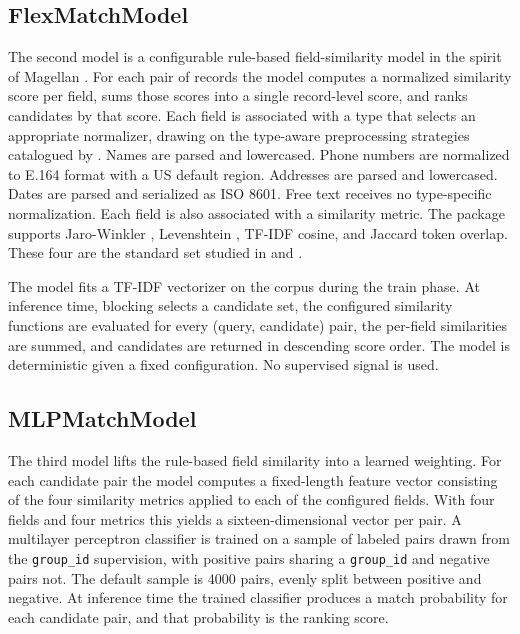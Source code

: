 \documentclass[10pt,letterpaper]{article}
\begin{document}
\subsection{FlexMatchModel}

The second model is a configurable rule-based field-similarity model
in the spirit of Magellan \citep{konda2016}. For each pair of records
the model computes a normalized similarity score per field, sums those
scores into a single record-level score, and ranks candidates by that
score. Each field is associated with a type that selects an
appropriate normalizer, drawing on the type-aware preprocessing
strategies catalogued by \citet[chap.\ 3]{christen2012}. Names are
parsed and lowercased. Phone numbers are normalized to E.164 format
with a US default region. Addresses are parsed and lowercased. Dates
are parsed and serialized as ISO 8601. Free text receives no
type-specific normalization. Each field is also associated with a
similarity metric. The package supports Jaro-Winkler
\citep{winkler1990}, Levenshtein \citep{levenshtein1966}, TF-IDF
cosine, and Jaccard token overlap. These four are the standard set
studied in \citet{bilenko2003} and \citet{cohen2003}.

The model fits a TF-IDF vectorizer on the corpus during the train
phase. At inference time, blocking selects a candidate set, the
configured similarity functions are evaluated for every (query,
candidate) pair, the per-field similarities are summed, and candidates
are returned in descending score order. The model is deterministic
given a fixed configuration. No supervised signal is used.

\subsection{MLPMatchModel}

The third model lifts the rule-based field similarity into a learned
weighting. For each candidate pair the model computes a fixed-length
feature vector consisting of the four similarity metrics applied to
each of the configured fields. With four fields and four metrics this
yields a sixteen-dimensional vector per pair. A multilayer perceptron
classifier \citep{rumelhart1986} is trained on a sample of labeled
pairs drawn from the \texttt{group\_id} supervision, with positive
pairs sharing a \texttt{group\_id} and negative pairs not. The
default sample is 4000 pairs, evenly split between positive and
negative. At inference time the trained classifier produces a match
probability for each candidate pair, and that probability is the
ranking score.
\end{document}
